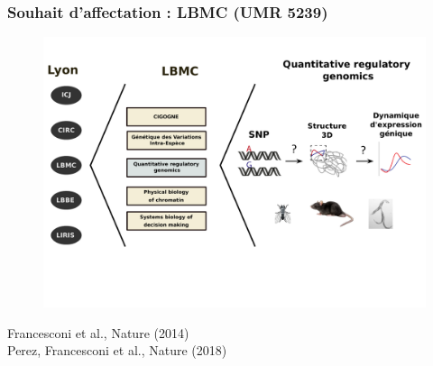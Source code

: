 \documentclass[11pt,xcolor=dvipsnames]{beamer}
\begin{document}
\begin{frame}
\frametitle{Souhait d'affectation : LBMC (UMR 5239)}
\begin{figure}
\includegraphics[width=0.9\linewidth]{schemas/integration_lbmc_ecosystem.pdf}
\end{figure}
\vspace{-1em}
\begin{flushright}
\tiny
Francesconi et al., Nature (2014) \\
Perez, Francesconi et al., Nature (2018) \\
\end{flushright}
\end{frame}
\end{document}
